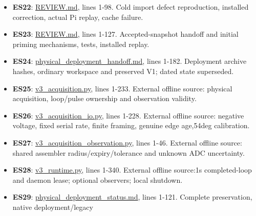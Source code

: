 \documentclass[
  10pt,
  letterpaper,
]{article}
\begin{document}
\begin{itemize}
  \textbf{ES21}:
  \href{/home/mattb/dsim-lab/docs/esc_physical_v3.md:1}{esc\_physical\_v3.md},
  lines 1-135. Operator command, recovery, Vicon protocol, selected
  current settings and promotion boundary.
\item
  \textbf{ES22}:
  \href{/home/mattb/Experiments/GESC-Gaussian/v3/worker_init_20260930T215232Z/REVIEW.md:1}{REVIEW.md},
  lines 1-98. Cold import defect reproduction, installed correction,
  actual Pi replay, cache failure.
\item
  \textbf{ES23}:
  \href{/home/mattb/Experiments/GESC-Gaussian/v3/steering_handoff_20261001T040328Z/REVIEW.md:1}{REVIEW.md},
  lines 1-127. Accepted-snapshot handoff and initial priming mechanisms,
  tests, installed replay.
\item
  \textbf{ES24}:
  \href{/home/mattb/dsim-lab/docs/codex/gesc_gaussian/v3/physical_deployment_handoff.md:1}{physical\_deployment\_handoff.md},
  lines 1-182. Deployment archive hashes, ordinary workspace and
  preserved V1; dated state superseded.
\item
  \textbf{ES25}:
  \href{/home/mattb/physical_TB3_files_snapshot/pi/ros2_ws/src/turtlebot3_vehicle_nodes/turtlebot3_vehicle_nodes/v3_acquisition.py:1}{v3\_acquisition.py},
  lines 1-233. External offline source: physical acquisition, loop/pulse
  ownership and observation validity.
\item
  \textbf{ES26}:
  \href{/home/mattb/physical_TB3_files_snapshot/pi/ros2_ws/src/turtlebot3_vehicle_nodes/turtlebot3_vehicle_nodes/v3_acquisition_io.py:1}{v3\_acquisition\_io.py},
  lines 1-228. External offline source: negative voltage, fixed serial
  rate, finite framing, genuine edge age,54deg calibration.
\item
  \textbf{ES27}:
  \href{/home/mattb/physical_TB3_files_snapshot/pi/ros2_ws/src/turtlebot3_vehicle_nodes/turtlebot3_vehicle_nodes/v3_acquisition_observation.py:1}{v3\_acquisition\_observation.py},
  lines 1-46. External offline source: shared assembler
  radius/expiry/tolerance and unknown ADC uncertainty.
\item
  \textbf{ES28}:
  \href{/home/mattb/physical_TB3_files_snapshot/pi/ros2_ws/src/turtlebot3_vehicle_nodes/turtlebot3_vehicle_nodes/v3_runtime.py:1}{v3\_runtime.py},
  lines 1-340. External offline source:1s completed-loop and daemon
  lease; optional observers; local shutdown.
\item
  \textbf{ES29}:
  \href{/home/mattb/dsim-lab/docs/codex/gesc_gaussian/v3/physical_deployment_status.md:1}{physical\_deployment\_status.md},
  lines 1-121. Complete preservation, native deployment/legacy

\end{itemize}
\end{document}
